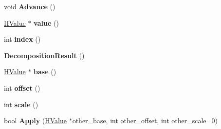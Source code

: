\begin{DoxyCompactItemize}
\item 
void {\bfseries Advance} ()\hypertarget{classv8_1_1internal_1_1_b_a_s_e___e_m_b_e_d_d_e_d_a3d99e222f406f37deb9382e9e370b68a}{}\label{classv8_1_1internal_1_1_b_a_s_e___e_m_b_e_d_d_e_d_a3d99e222f406f37deb9382e9e370b68a}

\item 
\hyperlink{classv8_1_1internal_1_1_h_value}{H\+Value} $\ast$ {\bfseries value} ()\hypertarget{classv8_1_1internal_1_1_b_a_s_e___e_m_b_e_d_d_e_d_a8e9df7bb730eb7cc0f875e2f63efafaf}{}\label{classv8_1_1internal_1_1_b_a_s_e___e_m_b_e_d_d_e_d_a8e9df7bb730eb7cc0f875e2f63efafaf}

\item 
int {\bfseries index} ()\hypertarget{classv8_1_1internal_1_1_b_a_s_e___e_m_b_e_d_d_e_d_ab1c83ed4992ecdf156c04883ff49b8a0}{}\label{classv8_1_1internal_1_1_b_a_s_e___e_m_b_e_d_d_e_d_ab1c83ed4992ecdf156c04883ff49b8a0}

\item 
{\bfseries Decomposition\+Result} ()\hypertarget{classv8_1_1internal_1_1_b_a_s_e___e_m_b_e_d_d_e_d_a0a268d545cd35ed373d228723a19c045}{}\label{classv8_1_1internal_1_1_b_a_s_e___e_m_b_e_d_d_e_d_a0a268d545cd35ed373d228723a19c045}

\item 
\hyperlink{classv8_1_1internal_1_1_h_value}{H\+Value} $\ast$ {\bfseries base} ()\hypertarget{classv8_1_1internal_1_1_b_a_s_e___e_m_b_e_d_d_e_d_af798fad2fac6ab3bb12f6aa2634f78f5}{}\label{classv8_1_1internal_1_1_b_a_s_e___e_m_b_e_d_d_e_d_af798fad2fac6ab3bb12f6aa2634f78f5}

\item 
int {\bfseries offset} ()\hypertarget{classv8_1_1internal_1_1_b_a_s_e___e_m_b_e_d_d_e_d_af25464bd56d72a7b1413e3df99cce050}{}\label{classv8_1_1internal_1_1_b_a_s_e___e_m_b_e_d_d_e_d_af25464bd56d72a7b1413e3df99cce050}

\item 
int {\bfseries scale} ()\hypertarget{classv8_1_1internal_1_1_b_a_s_e___e_m_b_e_d_d_e_d_a33505e82e07c25ffb33d91915eca463c}{}\label{classv8_1_1internal_1_1_b_a_s_e___e_m_b_e_d_d_e_d_a33505e82e07c25ffb33d91915eca463c}

\item 
bool {\bfseries Apply} (\hyperlink{classv8_1_1internal_1_1_h_value}{H\+Value} $\ast$other\+\_\+base, int other\+\_\+offset, int other\+\_\+scale=0)\hypertarget{classv8_1_1internal_1_1_b_a_s_e___e_m_b_e_d_d_e_d_a72cca0eb069919598fa1fb9145c70395}{}\label{classv8_1_1internal_1_1_b_a_s_e___e_m_b_e_d_d_e_d_a72cca0eb069919598fa1fb9145c70395}


\end{DoxyCompactItemize}
